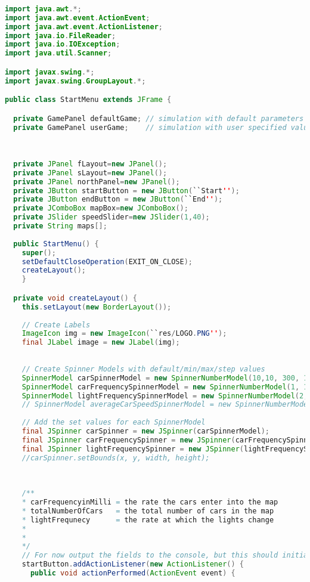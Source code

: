 \begin{lstlisting}[language=java]



import java.awt.*;
import java.awt.event.ActionEvent;
import java.awt.event.ActionListener;
import java.io.FileReader;
import java.io.IOException;
import java.util.Scanner;

import javax.swing.*;
import javax.swing.GroupLayout.*;

public class StartMenu extends JFrame {

  private GamePanel defaultGame; // simulation with default parameters  
  private GamePanel userGame;    // simulation with user specified values
  
  

  private JPanel fLayout=new JPanel();
  private JPanel sLayout=new JPanel();
  private JPanel northPanel=new JPanel();
  private JButton startButton = new JButton(``Start'');
  private JButton endButton = new JButton(``End'');
  private JComboBox mapBox=new JComboBox();
  private JSlider speedSlider=new JSlider(1,40);
  private String maps[];
  
  public StartMenu() {
    super();
    setDefaultCloseOperation(EXIT_ON_CLOSE);
    createLayout();
    }

  private void createLayout() {
    this.setLayout(new BorderLayout());
    
    // Create Labels
    ImageIcon img = new ImageIcon(``res/LOGO.PNG'');
    final JLabel image = new JLabel(img);
        
    
    // Create Spinner Models with default/min/max/step values
    SpinnerModel carSpinnerModel = new SpinnerNumberModel(10,10, 300, 1);
    SpinnerModel carFrequencySpinnerModel = new SpinnerNumberModel(1, 1, 5,1);
    SpinnerModel lightFrequencySpinnerModel = new SpinnerNumberModel(2, 2,6, 1);
    // SpinnerModel averageCarSpeedSpinnerModel = new SpinnerNumberModel();
    
    // Add the set values for each SpinnerModel
    final JSpinner carSpinner = new JSpinner(carSpinnerModel);
    final JSpinner carFrequencySpinner = new JSpinner(carFrequencySpinnerModel);
    final JSpinner lightFrequencySpinner = new JSpinner(lightFrequencySpinnerModel);
    //carSpinner.setBounds(x, y, width, height);
    
    
    
    /**
    * carFrequencyinMilli = the rate the cars enter into the map 
    * totalNumberOfCars   = the total number of cars in the map 
    * lightFrequnecy      = the rate at which the lights change
    * 
    * 
    */
    // For now output the fields to the console, but this should initiate the game with the field values 
    startButton.addActionListener(new ActionListener() {
      public void actionPerformed(ActionEvent event) {
        

\end{lstlisting}
